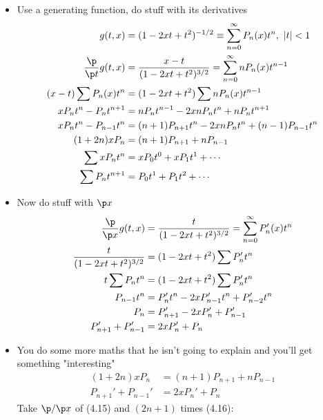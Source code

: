\documentclass[cplx.tex]{subfiles}
\begin{document}
\chapter{}
\begin{itemize}
    \item Use a generating function, do stuff with its derivatives
        \begin{align}
            g(t,x) &= (1-2xt+t^2)^{-1/2} \equiv \sum_{n=0}^\infty P_n(x)t^n,~ |t| < 1 \\
            \frac{\p}{\p t} g(t,x) &= \frac{x-t}{(1-2xt+t^2)^{3/2}} = \sum_{n=0}^{\infty} nP_n(x)t^{n-1} \\
            (x-t)\sum P_n(x)t^n &= (1-2xt+t^2)\sum nP_n(x)t^{n-1} \\
            xP_nt^n - P_nt^{n+1} &= nP_nt^{n-1} - 2xnP_nt^n + nP_nt^{n+1} \\
            xP_nt^n - P_{n-1}t^n &= (n+1)P_{n+1}t^n - 2xnP_nt^n + (n-1)P_{n-1}t^n \\
            (1+2n)xP_n &= (n+1)P_{n+1} + nP_{n-1} \\
            \sum xP_nt^n &= xP_0t^0 + xP_1t^1 + \cdots \\
            \sum P_nt^{n+1} &= P_0t^1 + P_1t^2 + \cdots
        \end{align}
    \item Now do stuff with $\p x$
        \begin{align}
            \frac{\p}{\p x}g(t,x) &= \frac{t}{(1-2xt+t^2)^{3/2}} = \sum_{n=0}^\infty P_n'(x)t^n \\
            \frac{t}{(1-2xt+t^2)^{3/2}} &= (1-2xt+t^2)\sum P_n't^n \\
            t\sum P_nt^n &= (1-2xt+t^2) \sum P_n't^n \\
            P_{n-1}t^n &= P_n't^n - 2xP_{n-1}'t^n + P_{n-2}'t^n \\
            P_n &= P_{n+1}' - 2xP_n' + P_{n-1}' \\
            P_{n+1}' + P_{n-1}' &= 2xP_n' + P_n
        \end{align}
    \item You do some more maths that he isn't going to explain and you'll get something "interesting"
        \begin{align}
            (1+2n)xP_n &= (n+1)P_{n+1} + nP_{n-1} \\
            P_{n+1}' + P_{n-1}' &= 2xP_n' + P_n 
        \end{align}
        Take $\p/\p x$ of (4.15) and $(2n+1)$ times (4.16):
        \begin{align}

\end{align}
\end{itemize}
\end{document}
